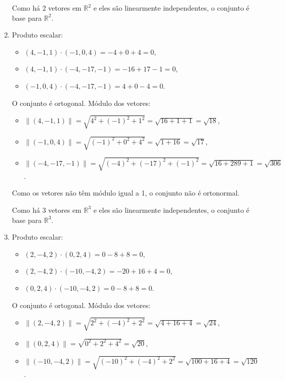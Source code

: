 \begin{resolution}
\begin{enumerate}[label=\alph*)]
          Como há 2 vetores em \(\mathbb{R}^2\) e eles são linearmente independentes, o conjunto é base para \(\mathbb{R}^2\).
    \item Produto escalar:
          \begin{itemize}
            \item \((4, -1, 1) \cdot (-1, 0, 4) = -4 + 0 + 4 = 0\),
            \item \((4, -1, 1) \cdot (-4, -17, -1) = -16 + 17 - 1 = 0\),
            \item \((-1, 0, 4) \cdot (-4, -17, -1) = 4 + 0 - 4 = 0\).
          \end{itemize}
          O conjunto é ortogonal. Módulo dos vetores:

          \begin{itemize}
            \item \(\|(4, -1, 1)\| = \sqrt{4^2 + (-1)^2 + 1^2} = \sqrt{16 + 1 + 1} = \sqrt{18}\),
            \item \(\|(-1, 0, 4)\| = \sqrt{(-1)^2 + 0^2 + 4^2} = \sqrt{1 + 16} = \sqrt{17}\),
            \item \(\|(-4, -17, -1)\| = \sqrt{(-4)^2 + (-17)^2 + (-1)^2} = \sqrt{16 + 289 + 1} = \sqrt{306}\).
          \end{itemize}

          Como os vetores não têm módulo igual a 1, o conjunto não é ortonormal.

          Como há 3 vetores em \(\mathbb{R}^3\) e eles são linearmente independentes, o conjunto é base para \(\mathbb{R}^3\).

    \item Produto escalar:
          \begin{itemize}
            \item \((2, -4, 2) \cdot (0, 2, 4) = 0 - 8 + 8 = 0\),
            \item \((2, -4, 2) \cdot (-10, -4, 2) = -20 + 16 + 4 = 0\),
            \item \((0, 2, 4) \cdot (-10, -4, 2) = 0 - 8 + 8 = 0\).
          \end{itemize}

          O conjunto é ortogonal. Módulo dos vetores:
          \begin{itemize}
            \item \(\|(2, -4, 2)\| = \sqrt{2^2 + (-4)^2 + 2^2} = \sqrt{4 + 16 + 4} = \sqrt{24}\),
            \item \(\|(0, 2, 4)\| = \sqrt{0^2 + 2^2 + 4^2} = \sqrt{20}\),
            \item \(\|(-10, -4, 2)\| = \sqrt{(-10)^2 + (-4)^2 + 2^2} = \sqrt{100 + 16 + 4} = \sqrt{120}\).
          \end{itemize}


\end{enumerate}
\end{resolution}
